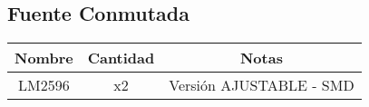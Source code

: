 \documentclass[a4paper,11pt]{article}
\begin{document}
\subsection{Fuente Conmutada}
\begin{table}[H]
\centering
\begin{tabular}{|c|c|c|}
\hline
Nombre & Cantidad  &  Notas\\
\hline
LM2596  &  x2  & Versión AJUSTABLE - SMD 	\\
\hline
\end{tabular}
\end{table}
\end{document}
